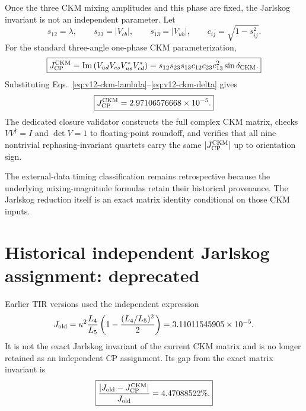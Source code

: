 Once the three CKM mixing amplitudes and this phase are fixed, the Jarlskog
invariant is not an independent parameter.  Let
\begin{equation}
s_{12}=\lambda,
\qquad
s_{23}=|V_{cb}|,
\qquad
s_{13}=|V_{ub}|,
\qquad
c_{ij}=\sqrt{1-s_{ij}^2}.
\label{eq:v12-ckm-sines}
\end{equation}
For the standard three-angle one-phase CKM parameterization,
\begin{equation}
\boxed{
J_{\rm CP}^{\rm CKM}
=\operatorname{Im}
\left(V_{ud}V_{cs}V_{us}^{\ast}V_{cd}^{\ast}\right)
=s_{12}s_{23}s_{13}c_{12}c_{23}c_{13}^{2}\sin\delta_{\rm CKM}.
}
\label{eq:v12-ckm-jarlskog}
\end{equation}
Substituting Eqs.~\eqref{eq:v12-ckm-lambda}--\eqref{eq:v12-ckm-delta}
gives
\begin{equation}
\boxed{
J_{\rm CP}^{\rm CKM}
=2.97106576668\times10^{-5}.
}
\label{eq:v12-ckm-jarlskog-value}
\end{equation}
The dedicated closure validator constructs the full complex CKM matrix,
checks $VV^\dagger=I$ and $\det V=1$ to floating-point roundoff, and verifies
that all nine nontrivial rephasing-invariant quartets carry the same
$|J_{\rm CP}^{\rm CKM}|$ up to orientation sign.

The external-data timing classification remains retrospective because the
underlying mixing-magnitude formulas retain their historical provenance.  The
Jarlskog reduction itself is an exact matrix identity conditional on those CKM
inputs.

\section{Historical independent Jarlskog assignment: deprecated}
Earlier TIR versions used the independent expression
\begin{equation}
J_{\rm old}
=\kappa^2\frac{L_4}{L_5}
\left(1-\frac{(L_4/L_5)^2}{2}\right)
=3.11011545905\times10^{-5}.
\label{eq:v12-ckm-j-old}
\end{equation}
It is not the exact Jarlskog invariant of the current CKM matrix and is no
longer retained as an independent CP assignment.  Its gap from the exact matrix
invariant is
\begin{equation}
\boxed{
\frac{|J_{\rm old}-J_{\rm CP}^{\rm CKM}|}{J_{\rm old}}
=4.47088522\%.
}
\label{eq:v12-ckm-j-old-gap}
\end{equation}

